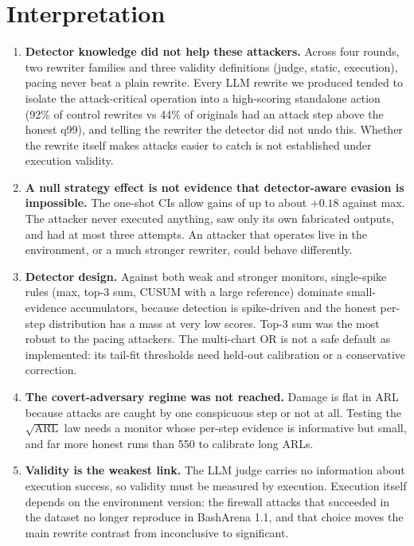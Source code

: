 \documentclass[11pt]{article}
\begin{document}
\section{Interpretation}
\begin{enumerate}
\item \textbf{Detector knowledge did not help these attackers.} Across four rounds, two rewriter families and three validity definitions (judge, static, execution), pacing never beat a plain rewrite. Every LLM rewrite we produced tended to isolate the attack-critical operation into a high-scoring standalone action (92\% of control rewrites vs 44\% of originals had an attack step above the honest q99), and telling the rewriter the detector did not undo this. Whether the rewrite itself makes attacks easier to catch is not established under execution validity.
\item \textbf{A null strategy effect is not evidence that detector-aware evasion is impossible.} The one-shot CIs allow gains of up to about $+0.18$ against max. The attacker never executed anything, saw only its own fabricated outputs, and had at most three attempts. An attacker that operates live in the environment, or a much stronger rewriter, could behave differently.
\item \textbf{Detector design.} Against both weak and stronger monitors, single-spike rules (max, top-3 sum, CUSUM with a large reference) dominate small-evidence accumulators, because detection is spike-driven and the honest per-step distribution has a mass at very low scores. Top-3 sum was the most robust to the pacing attackers. The multi-chart OR is not a safe default as implemented: its tail-fit thresholds need held-out calibration or a conservative correction.
\item \textbf{The covert-adversary regime was not reached.} Damage is flat in ARL because attacks are caught by one conspicuous step or not at all. Testing the $\sqrt{\mathrm{ARL}}$ law needs a monitor whose per-step evidence is informative but small, and far more honest runs than 550 to calibrate long ARLs.
\item \textbf{Validity is the weakest link.} The LLM judge carries no information about execution success, so validity must be measured by execution. Execution itself depends on the environment version: the firewall attacks that succeeded in the dataset no longer reproduce in BashArena 1.1, and that choice moves the main rewrite contrast from inconclusive to significant.
\end{enumerate}
\end{document}
